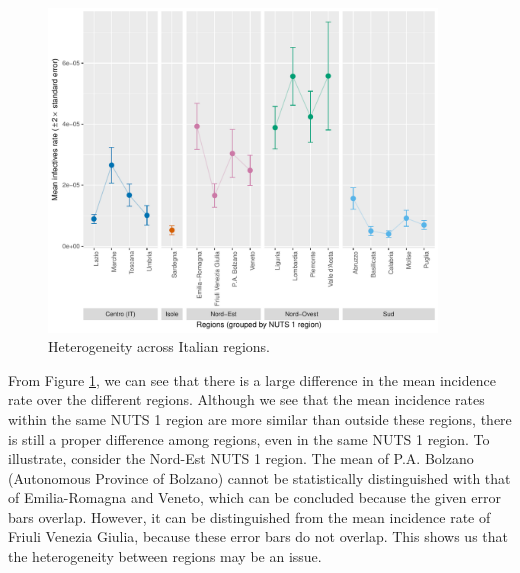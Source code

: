\documentclass[12pt]{article}
\begin{document}
	\begin{figure}[H]
	    \centering
	    \includegraphics[width=0.92\textwidth]{output/heterogeneity_over_regions.pdf}
	    \caption{Heterogeneity across Italian regions.}
	    \label{fig:heterogeneity_over_regions}
	\end{figure}
	
	From Figure \ref{fig:heterogeneity_over_regions}, we can see that there is a large difference in the mean incidence rate over the different regions. Although we see that the mean incidence rates within the same NUTS 1 region are more similar than outside these regions, there is still a proper difference among regions, even in the same NUTS 1 region. To illustrate, consider the Nord-Est NUTS 1 region. The mean of P.A. Bolzano (Autonomous Province of Bolzano) cannot be statistically distinguished with that of Emilia-Romagna and Veneto, which can be concluded because the given error bars overlap. However, it can be distinguished from the mean incidence rate of Friuli Venezia Giulia, because these error bars do not overlap. This shows us that the heterogeneity between regions may be an issue. \\
	
\end{document}
